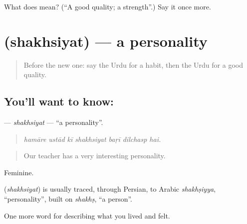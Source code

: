 \begin{tcolorbox}[breakable,colback=teal!4,colframe=teal!35!black,title={Before you move on}]
What does  mean? (\textquotedblleft{}A good quality; a strength\textquotedblright{}.) Say it once more.
\end{tcolorbox}
\section[\texorpdfstring{\ur{شخصیت} (shakhsiyat)}{شخصیت (shakhsiyat)}]{ (shakhsiyat) — a personality}

\label{lesson:UR-C454-shakhsiyat}



\begin{quote}
Before the new one: say the Urdu for a habit, then the Urdu for a good quality.
\end{quote}

\subsection*{You'll want to know: }
\textbf{} — \emph{shakhsiyat} — \textquotedblleft{}a personality\textquotedblright{}.

\begin{quote}
      
\end{quote}

\begin{quote}
\emph{hamāre ustād kī shakhsiyat baṛī dilchasp hai.}
\end{quote}

\begin{quote}
Our teacher has a very interesting personality.
\end{quote}

Feminine.

\begin{cousinweb}
\textbf{} (\emph{shakhsiyat}) is usually traced, through Persian, to Arabic \emph{shakhṣiyya}, \textquotedblleft{}personality\textquotedblright{}, built on \emph{shakhṣ}, \textquotedblleft{}a person\textquotedblright{}.
\end{cousinweb}

\begin{grammarlens}[title={What you've built}]
One more word for describing what you lived and felt.
\end{grammarlens}

